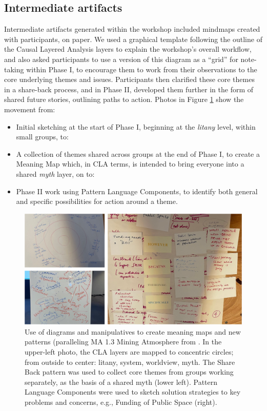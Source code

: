 \documentclass[acmlarge,timestamp]{acmart}
\DeclareRobustCommand{\scitshape}{\fontshape{\scitdefault}\selectfont}
\begin{document}
\subsection{Intermediate artifacts}

Intermediate artifacts generated within the workshop included mindmaps
created with participants, on paper.  We used a graphical template
following the outline of the Causal Layered Analysis layers to explain
the workshop’s overall workflow, and also asked participants to use a
version of this diagram as a “grid” for note-taking within Phase I, to
encourage them to work from their observations to the core underlying
themes and issues.  Participants then clarified these core themes in a
share-back process, and in Phase II, developed them further in the
form of shared future stories, outlining paths to action.  Photos in
Figure \ref{ExampleParticipantPattern} show the movement from:
\begin{itemize}
  \item Initial sketching at the start of Phase I, beginning at the
    \emph{litany} level, within small groups, to:
  \item A collection of themes shared across groups at the end of
    Phase I, to create a {\sc Meaning Map} which, in CLA terms, is
    intended to bring everyone into a shared \emph{myth} layer, on to:
  \item Phase II work using {\sc Pattern Language Components}, to
    identify both general and specific possibilities for action around
    a theme.
\end{itemize}

\begin{figure}
  \includegraphics[width=\textwidth]{PatternProcess.png}
  \caption{Use of diagrams and manipulatives to create meaning maps
    and new patterns (paralleling {\scitshape MA 1.3 Mining
      Atmosphere} from \citet{iba2016pattern}. In the upper-left
    photo, the CLA layers are mapped to concentric circles; from
    outside to center: litany, system, worldview, myth.  The {\sc
      Share Back} pattern was used to collect core themes from groups
    working separately, as the basis of a shared myth (lower left).
    {\sc Pattern Language Components} were used to sketch solution
    strategies to key problems and concerns, e.g., {\sc Funding of
      Public Space} (right). \label{ExampleParticipantPattern}}
\end{figure}
\end{document}
